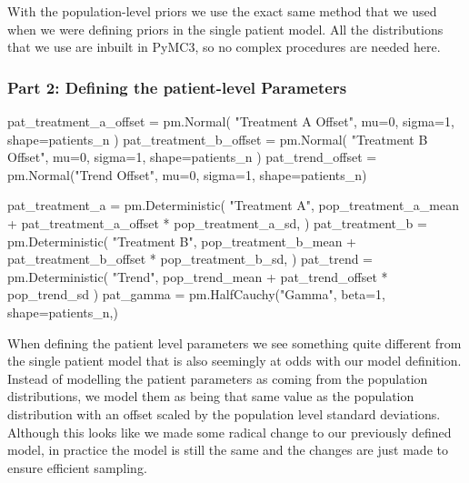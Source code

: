 \documentclass[12pt,a4paper,leqno]{report}
\theoremstyle{plain}
\theoremstyle{definition}
\theoremstyle{remark}
\begin{document}
With the population-level priors we use the exact same method that we used when we were
defining priors in the single patient model. All the distributions that we use are
inbuilt in PyMC3, so no complex procedures are needed here.

\subsubsection*{Part 2: Defining the patient-level Parameters}

\bigskip
\begin{pyverbatim}[][fontsize=\footnotesize]
    pat_treatment_a_offset = pm.Normal(
        "Treatment A Offset", mu=0, sigma=1, shape=patients_n
    )
    pat_treatment_b_offset = pm.Normal(
        "Treatment B Offset", mu=0, sigma=1, shape=patients_n
    )
    pat_trend_offset = pm.Normal("Trend Offset", mu=0, sigma=1, shape=patients_n)

    pat_treatment_a = pm.Deterministic(
        "Treatment A",
        pop_treatment_a_mean + pat_treatment_a_offset * pop_treatment_a_sd,
    )
    pat_treatment_b = pm.Deterministic(
        "Treatment B",
        pop_treatment_b_mean + pat_treatment_b_offset * pop_treatment_b_sd,
    )
    pat_trend = pm.Deterministic(
        "Trend", pop_trend_mean + pat_trend_offset * pop_trend_sd
    )
    pat_gamma = pm.HalfCauchy("Gamma", beta=1, shape=patients_n,)
\end{pyverbatim}
\smallskip

When defining the patient level parameters we see something quite different from the
single patient model that is also seemingly at odds with our model definition. Instead
of modelling the patient parameters as coming from the population distributions, we model
them as being that same value as the population distribution with an offset scaled by
the population level standard deviations. Although this looks like we made some radical
change to our previously defined model, in practice the model is still the same and
the changes are just made to ensure efficient sampling.
\end{document}

